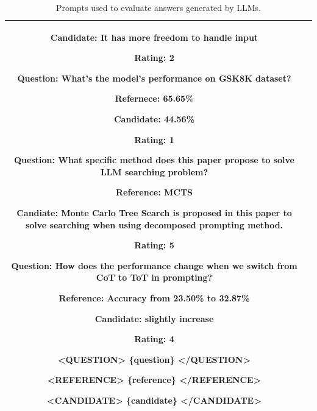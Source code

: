 \begin{table}[!t]
\begin{tabular}{cp{11.5cm}}
    Candidate: It has more freedom to handle input
    
    Rating: 2

    Question: What's the model's performance on GSK8K dataset? 
    
    Refernece: 65.65\%
    
    Candidate: 44.56\%
    
    Rating: 1

    Question: What specific method does this paper propose to solve LLM searching problem?
    
    Reference: MCTS
    
    Candiate: Monte Carlo Tree Search is proposed in this paper to solve searching when using decomposed prompting method.
    
    Rating: 5

    Question: How does the performance change when we switch from CoT to ToT in prompting? 
    
    Reference: Accuracy from 23.50\% to 32.87\%
    
    Candidate: slightly increase
    
    Rating: 4

    <QUESTION>
    \{question\}
    </QUESTION>

    <REFERENCE>
    \{reference\}
    </REFERENCE>

    <CANDIDATE>
    \{candidate\}
    </CANDIDATE>
\\
    \bottomrule
\end{tabular}
\caption{Prompts used to evaluate answers generated by LLMs.}
\label{tab:gpt_based_evaluator_app}
\end{table}